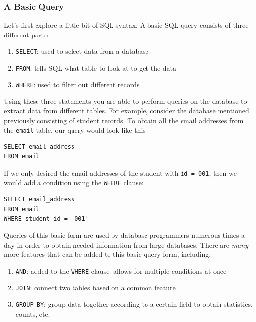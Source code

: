 \documentclass[
]{krantz}
\providecommand{\tightlist}{%
  \setlength{\itemsep}{0pt}\setlength{\parskip}{0pt}}
\begin{document}
\hypertarget{a-basic-query}{%
\subsubsection{A Basic Query}\label{a-basic-query}}

Let's first explore a little bit of SQL syntax. A basic SQL query consists of three different parts:

\begin{enumerate}
\def\labelenumi{\arabic{enumi}.}
\tightlist
\item
  \texttt{SELECT}: used to select data from a database
\item
  \texttt{FROM}: tells SQL what table to look at to get the data
\item
  \texttt{WHERE}: used to filter out different records
\end{enumerate}

Using these three statements you are able to perform queries on the database to extract data from different tables. For example, consider the database mentioned previously consisting of student records. To obtain all the email addresses from the \texttt{email} table, our query would look like this

\begin{verbatim}
SELECT email_address
FROM email
\end{verbatim}

If we only desired the email addresses of the student with \texttt{id\ =\ 001}, then we would add a condition using the \texttt{WHERE} clause:

\begin{verbatim}
SELECT email_address
FROM email
WHERE student_id = '001'
\end{verbatim}

Queries of this basic form are used by database programmers numerous times a day in order to obtain needed information from large databases. There are \emph{many} more features that can be added to this basic query form, including:

\begin{enumerate}
\def\labelenumi{\arabic{enumi}.}
\tightlist
\item
  \texttt{AND}: added to the \texttt{WHERE} clause, allows for multiple conditions at once
\item
  \texttt{JOIN}: connect two tables based on a common feature
\item
  \texttt{GROUP\ BY}: group data together according to a certain field to obtain statistics, counts, etc.
\end{enumerate}
\end{document}
